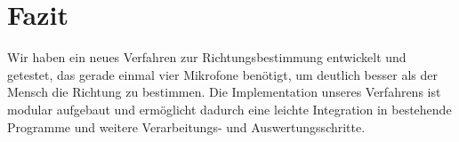\section{Fazit} 
Wir haben ein neues Verfahren zur Richtungsbestimmung entwickelt und getestet, das gerade einmal vier Mikrofone benötigt, um deutlich besser als der Mensch die Richtung zu bestimmen. Die Implementation unseres Verfahrens ist modular aufgebaut und ermöglicht dadurch eine leichte Integration in bestehende Programme und weitere Verarbeitungs- und Auswertungsschritte.
